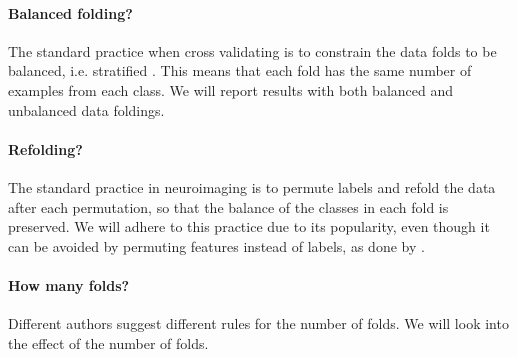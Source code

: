 \documentclass[12pt,a4paper]{article}
\begin{document}
\paragraph{Balanced folding?}
The standard practice when cross validating is to constrain the data folds to be balanced, i.e. stratified \citep[e.g.][]{ojala_permutation_2010}.
This means that each fold has the same number of examples from each class. 
We will report results with both balanced and unbalanced data foldings. 


\paragraph{Refolding?}
The standard practice in neuroimaging is to permute labels and refold the data after each permutation, so that the balance of the classes in each fold is preserved.
We will adhere to this practice due to its popularity, even though it can be avoided by permuting features instead of labels, as done by \citet{golland_permutation_2005}.


\paragraph{How many folds?}
Different authors suggest different rules for the number of folds. 
We will look into the effect of the number of folds. 
\end{document}
